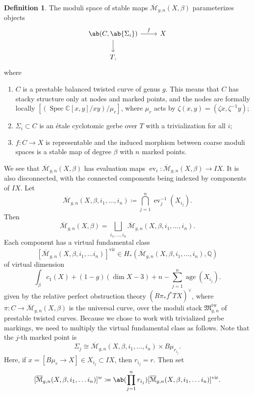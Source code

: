 \documentclass[leqno, openany]{memoir}
\theoremstyle{definition}
\newtheorem{defn}[thm]{Definition}
\theoremstyle{remark}
\theoremstyle{plain}
\theoremstyle{definition}
\theoremstyle{remark}
\newcommand{\C}{\mathbb{C}}
\newcommand{\Q}{\mathbb{Q}}
\newcommand{\mc}[1]{\mathcal{#1}}
\newcommand{\mf}[1]{\mathfrak{#1}}
\newcommand{\mr}[1]{\mathrm{#1}}
\newcommand{\on}[1]{\operatorname{#1}}
\newcommand{\ol}[1]{\overline{#1}}
\newcommand{\vir}{\mr{vir}}
\DeclareMathOperator{\Spec}{Spec}
\begin{document}
\begin{defn}
    The moduli space of stable maps $\ol{\mc{M}}_{g,n}(X,\beta)$ parameterizes objects
    \begin{equation*}
    \begin{tikzcd}
        \ab(C, \ab\{\Sigma_i\}) \ar{r}{f} \ar{d} & X \\
        T,
    \end{tikzcd}
    \end{equation*}
    where
    \begin{enumerate}
        \item $C$ is a prestable balanced twisted curve of genus $g$. This means that $C$ has stacky structure only at nodes and marked points, and the nodes are formally locally $[(\Spec \C[x,y]/xy)/\mu_r]$, where $\mu_r$ acts by $\zeta(x,y) = (\zeta x, \zeta^{-1} y)$;
        \item $\Sigma_i \subset C$ is an \'etale cyclotomic gerbe over $T$ with a trivialization for all $i$;
        \item $f \colon C \to X$ is representable and the induced morphism between coarse moduli spaces is a stable map of degree $\beta$ with $n$ marked points.
    \end{enumerate}
\end{defn}

We see that $\ol{\mc{M}}_{g,n}(X,\beta)$ has evaluation maps $\on{ev}_i \colon \ol{\mc{M}}_{g,n}(X,\beta) \to IX$. It is also disconnected, with the connected components being indexed by components of $IX$. Let
\[ \ol{\mc{M}}_{g,n}(X,\beta,i_1,\ldots,i_n) \coloneqq \bigcap_{j=1}^n \on{ev}_j^{-1}(X_{i_j}). \]
Then
\[ \ol{\mc{M}}_{g,n}(X,\beta) = \bigsqcup_{i_1, \ldots, i_n} \ol{\mc{M}}_{g,n}(X,\beta,i_1,\ldots,i_n). \]
Each component has a virtual fundamental class
\[ [\ol{\mc{M}}_{g,n}(X,\beta,i_1, \ldots i_n)]^{\vir} \in H_*(\ol{\mc{M}}_{g,n}(X,\beta,i_1,\ldots, i_n), \Q) \]
of virtual dimension
\[ \int_{\beta} c_1(X) + (1-g)(\dim X - 3) + n - \sum_{j=1}^n \on{age}(X_{i_j}). \]
given by the relative perfect obstruction theory $(R \pi_* f^* TX)^{\vee}$, where $\pi \colon C \to \ol{\mc{M}}_{g,n}(X,\beta)$ is the universal curve, over the moduli stack $\mf{M}_{g,n}^{\mr{tw}}$ of prestable twisted curves. Because we chose to work with trivialized gerbe markings, we need to multiply the virtual fundamental class as follows. Note that the $j$-th marked point is 
\[ \Sigma_{j} \cong \ol{\mc{M}}_{g,n}(X,\beta,i_1,\ldots,i_n) \times B\mu_{r_{i_j}}. \] 
Here, if $x = [B\mu_r \to X] \in X_{i_j} \subset IX$, then $r_{i_j} = r$. Then set
\[  [\ol{\mc{M}}_{g,n}(X,\beta,i_1, \ldots i_n)]^{w} \coloneqq \ab(\prod_{j=1}^n r_{i_j}) [\ol{\mc{M}}_{g,n}(X,\beta,i_1, \ldots i_n)]^{\vir}. \]
\end{document}
